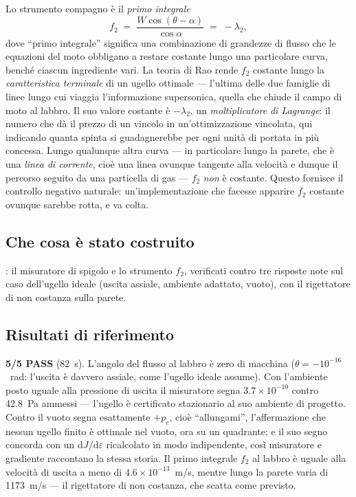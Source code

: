 Lo strumento compagno è il \emph{primo integrale}
\begin{equation}
f_2 \;=\; \frac{W\cos(\theta-\alpha)}{\cos\alpha} \;=\; -\lambda_2 ,
\label{eq:f2}
\end{equation}
dove ``primo integrale'' significa una combinazione di grandezze di
flusso che le equazioni del moto obbligano a restare costante lungo
una particolare curva, benché ciascun ingrediente vari. La teoria di
Rao rende $f_2$ costante lungo la \emph{caratteristica terminale} di
un ugello ottimale --- l'ultima delle due famiglie di linee lungo
cui viaggia l'informazione supersonica, quella che chiude il campo
di moto al labbro. Il suo valore costante è $-\lambda_2$, un
\emph{moltiplicatore di Lagrange}: il numero che dà il prezzo di un
vincolo in un'ottimizzazione vincolata, qui indicando quanta spinta
si guadagnerebbe per ogni unità di portata in più concessa. Lungo
qualunque altra curva --- in particolare lungo la parete, che è una
\emph{linea di corrente}, cioè una linea ovunque tangente alla
velocità e dunque il percorso seguito da una particella di gas ---
$f_2$ \emph{non} è costante. Questo fornisce il controllo negativo
naturale: un'implementazione che facesse apparire $f_2$ costante
ovunque sarebbe rotta, e va colta.

\subsection{Che cosa è stato costruito}

: il misuratore di
spigolo e lo strumento $f_2$, verificati contro tre risposte note
sul caso dell'ugello ideale (uscita assiale, ambiente adattato,
vuoto), con il rigettatore di non costanza sulla parete.

\subsection{Risultati di riferimento}

\textbf{5/5 PASS} (82~s). L'angolo del flusso al labbro è zero di
macchina ($\theta = -10^{-16}$~rad: l'uscita è davvero assiale, come
l'ugello ideale assume). Con l'ambiente posto uguale alla pressione
di uscita il misuratore segna $3.7\times10^{-10}$ contro 42.8~Pa
ammessi --- l'ugello è certificato stazionario al suo ambiente di
progetto. Contro il vuoto segna esattamente $+p_e$, cioè
``allungami'', l'affermazione che nessun ugello finito è ottimale
nel vuoto, ora su un quadrante; e il suo segno concorda con un
$\mathrm{d}J/\mathrm{d}\varepsilon$ ricalcolato in modo
indipendente, così misuratore e gradiente raccontano la stessa
storia. Il primo integrale $f_2$ al labbro è uguale alla velocità di
uscita a meno di $4.6\times10^{-13}$~m/s, mentre lungo la parete
varia di 1173~m/s --- il rigettatore di non costanza, che scatta
come previsto.
